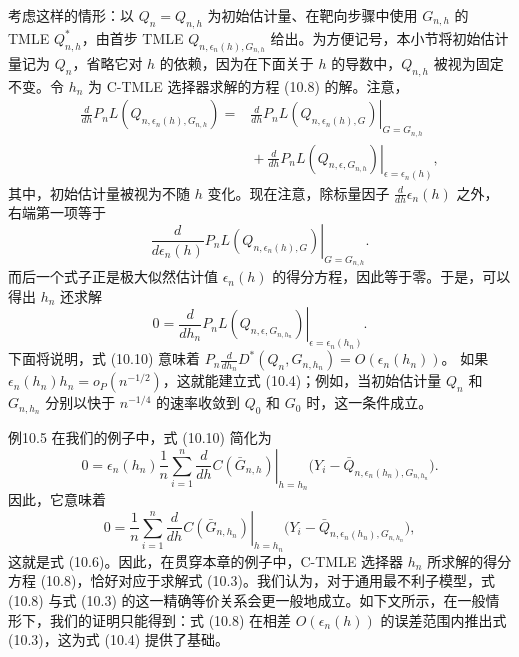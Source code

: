 考虑这样的情形：以 $Q_n=Q_{n,h}$ 为初始估计量、在靶向步骤中使用 $G_{n,h}$ 的 TMLE $Q_{n,h}^*$，由首步 TMLE $Q_{n,\epsilon_n(h),G_{n,h}}$ 给出。为方便记号，本小节将初始估计量记为 $Q_n$，省略它对 $h$ 的依赖，因为在下面关于 $h$ 的导数中，$Q_{n,h}$ 被视为固定不变。令 $h_n$ 为 C-TMLE 选择器求解的方程 (10.8) 的解。注意，
\[
 \begin{aligned}
 \frac{d}{dh}P_nL(Q_{n,\epsilon_n(h),G_{n,h}})
 ={}&\left.\frac{d}{dh}P_nL(Q_{n,\epsilon_n(h),G})\right|_{G=G_{n,h}}\\
 &{}+\left.\frac{d}{dh}P_nL(Q_{n,\epsilon,G_{n,h}})
              \right|_{\epsilon=\epsilon_n(h)},
 \end{aligned}
\]
其中，初始估计量被视为不随 $h$ 变化。现在注意，除标量因子 $\frac{d}{dh}\epsilon_n(h)$ 之外，右端第一项等于
\[
 \left.\frac{d}{d\epsilon_n(h)}P_nL(Q_{n,\epsilon_n(h),G})
 \right|_{G=G_{n,h}}.
\]
而后一个式子正是极大似然估计值 $\epsilon_n(h)$ 的得分方程，因此等于零。于是，可以得出 $h_n$ 还求解
\begin{equation}
 0=\left.\frac{d}{dh_n}P_nL(Q_{n,\epsilon,G_{n,h_n}})
   \right|_{\epsilon=\epsilon_n(h_n)}.
 \tag{10.10}
\end{equation}
下面将说明，式 (10.10) 意味着
$P_n\frac{d}{dh_n}D^*(Q_n,G_{n,h_n})=O(\epsilon_n(h_n))$。
如果 $\epsilon_n(h_n)h_n=o_P(n^{-1/2})$，这就能建立式 (10.4)；例如，当初始估计量 $Q_n$ 和 $G_{n,h_n}$ 分别以快于 $n^{-1/4}$ 的速率收敛到 $Q_0$ 和 $G_0$ 时，这一条件成立。

\begin{bookresult}{例}{10.5}
在我们的例子中，式 (10.10) 简化为
\[
 0=\epsilon_n(h_n)\frac1n\sum_{i=1}^n
 \left.\frac{d}{dh}C(\bar G_{n,h})\right|_{h=h_n}
 \bigl(Y_i-\bar Q_{n,\epsilon_n(h_n),G_{n,h_n}}\bigr).
\]
因此，它意味着
\[
 0=\frac1n\sum_{i=1}^n
 \left.\frac{d}{dh}C(\bar G_{n,h_n})\right|_{h=h_n}
 \bigl(Y_i-\bar Q_{n,\epsilon_n(h_n),G_{n,h_n}}\bigr),
\]
这就是式 (10.6)。因此，在贯穿本章的例子中，C-TMLE 选择器 $h_n$ 所求解的得分方程 (10.8)，恰好对应于求解式 (10.3)。我们认为，对于通用最不利子模型，式 (10.8) 与式 (10.3) 的这一精确等价关系会更一般地成立。如下文所示，在一般情形下，我们的证明只能得到：式 (10.8) 在相差 $O(\epsilon_n(h))$ 的误差范围内推出式 (10.3)，这为式 (10.4) 提供了基础。
\end{bookresult}

